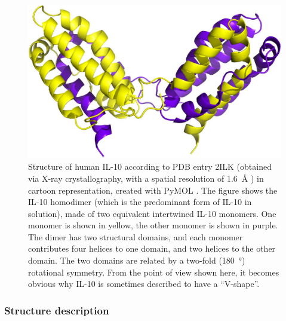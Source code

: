 \begin{figure}
\centering
\includegraphics[width=1.0\textwidth]{gfx/background/IL10_2ilk_dimer_yellow_blue.jpg}
\caption[]{
Structure of human IL-10 according to PDB entry 2ILK (obtained via X-ray
crystallography, with a spatial resolution of \SI{1.6}{\angstrom}
\cite{Zdanov1996}) in cartoon representation, created with PyMOL \cite{pymol}.
The figure shows the IL-10 homodimer (which is the predominant form of IL-10 in
solution), made of two equivalent intertwined IL-10 monomers. One monomer is
shown in yellow, the other monomer is shown in purple. The dimer has two
structural domains, and each monomer contributes four helices to one domain, and
two helices to the other domain. The two domains are related by a two-fold
(\SI{180}{\degree}) rotational symmetry. From the point of view shown here, it
becomes obvious why IL-10 is sometimes described to have a \enquote{V-shape}.
}
\label{fig:bg:il10_dimer_vshape}
\end{figure}

\subsubsection{Structure description}

